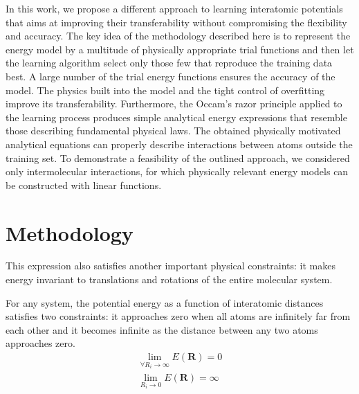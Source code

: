\documentclass[aps,prl,reprint,amsmath,amssymb,nature]{revtex4-1}
\begin{document}
In this work, we propose a different approach to learning interatomic potentials that aims at improving their transferability without compromising the flexibility and accuracy. 
The key idea of the methodology described here is to represent the energy model by a multitude of physically appropriate trial functions and then let the learning algorithm select only those few that reproduce the training data best. 
A large number of the trial energy functions ensures the accuracy of the model. 
The physics built into the model and the tight control of overfitting improve its transferability. 
Furthermore, the Occam's razor principle applied to the learning process produces simple analytical energy expressions that resemble those describing fundamental physical laws. 
The obtained physically motivated analytical equations can properly describe interactions between atoms outside the training set. 
To demonstrate a feasibility of the outlined approach, we considered only intermolecular interactions, for which physically relevant energy models can be constructed with linear functions.

\section{Methodology}


This expression also satisfies another important physical constraints: it makes energy invariant to translations and rotations of the entire molecular system. 

For any system, the potential energy as a function of interatomic distances satisfies two constraints: it approaches zero when all atoms are infinitely far from each other and it becomes infinite as the distance between any two atoms approaches zero.
%
\begin{eqnarray}
\lim_{\forall R_i \rightarrow \infty} E (\mathbf{R}) = 0 \\
\lim_{R_i \rightarrow 0} E (\mathbf{R}) = \infty
\end{eqnarray}
\end{document}
